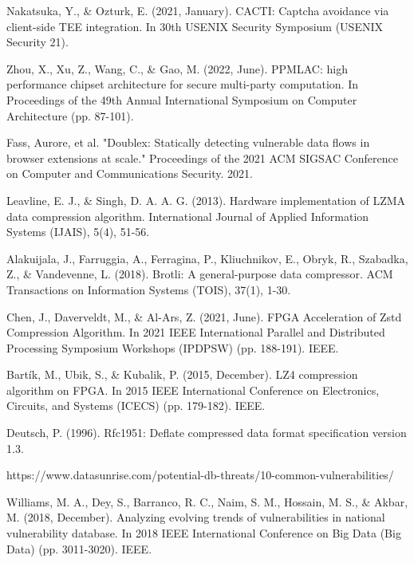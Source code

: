 %
%
%
% 
% 
%

\begin{thebibliography}{8}
	Nakatsuka, Y., \& Ozturk, E. (2021, January). CACTI: Captcha avoidance via client-side TEE integration. In 30th USENIX Security Symposium (USENIX Security 21).



	Zhou, X., Xu, Z., Wang, C., \& Gao, M. (2022, June). PPMLAC: high performance chipset architecture for secure multi-party computation. In Proceedings of the 49th Annual International Symposium on Computer Architecture (pp. 87-101).

	Fass, Aurore, et al. "Doublex: Statically detecting vulnerable data flows in browser extensions at scale." Proceedings of the 2021 ACM SIGSAC Conference on Computer and Communications Security. 2021.

	Leavline, E. J., \& Singh, D. A. A. G. (2013). Hardware implementation of LZMA data compression algorithm. International Journal of Applied Information Systems (IJAIS), 5(4), 51-56.

	Alakuijala, J., Farruggia, A., Ferragina, P., Kliuchnikov, E., Obryk, R., Szabadka, Z., \& Vandevenne, L. (2018). Brotli: A general-purpose data compressor. ACM Transactions on Information Systems (TOIS), 37(1), 1-30.

	Chen, J., Daverveldt, M., \& Al-Ars, Z. (2021, June). FPGA Acceleration of Zstd Compression Algorithm. In 2021 IEEE International Parallel and Distributed Processing Symposium Workshops (IPDPSW) (pp. 188-191). IEEE.

	Bartík, M., Ubik, S., \& Kubalik, P. (2015, December). LZ4 compression algorithm on FPGA. In 2015 IEEE International Conference on Electronics, Circuits, and Systems (ICECS) (pp. 179-182). IEEE.

	Deutsch, P. (1996). Rfc1951: Deflate compressed data format specification version 1.3.

	https://www.datasunrise.com/potential-db-threats/10-common-vulnerabilities/

	Williams, M. A., Dey, S., Barranco, R. C., Naim, S. M., Hossain, M. S., \& Akbar, M. (2018, December). Analyzing evolving trends of vulnerabilities in national vulnerability database. In 2018 IEEE International Conference on Big Data (Big Data) (pp. 3011-3020). IEEE.

\end{thebibliography}

